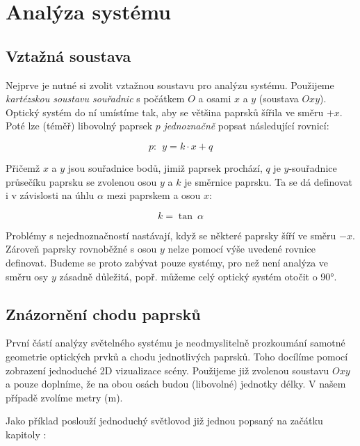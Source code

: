 \section{Analýza systému}
\label{sec:analyzasystemu}

\subsection{Vztažná soustava}

Nejprve je nutné si zvolit vztažnou soustavu pro analýzu systému. Použijeme \emph{kartézskou soustavu souřadnic} s počátkem $O$ a osami $x$ a $y$ (soustava $Oxy$). Optický systém do ní umístíme tak, aby se většina paprsků šířila ve směru $+x$. Poté lze (téměř) libovolný paprsek $p$ \emph{jednoznačně} popsat následující rovnicí:

\[ p:\ \ y = k \cdot x + q \]

Přičemž $x$ a $y$ jsou souřadnice bodů, jimiž paprsek prochází, $q$ je $y$-souřadnice průsečíku paprsku se zvolenou osou $y$ a $k$ je směrnice paprsku. Ta se dá definovat i v závislosti na úhlu $\alpha$ mezi paprskem a osou $x$:

\[ k = \tan\ \alpha \]

Problémy s nejednoznačností nastávají, když se některé paprsky šíří ve směru $-x$. Zároveň paprsky rovnoběžné s osou $y$ nelze pomocí výše uvedené rovnice definovat. Budeme se proto zabývat pouze systémy, pro než není analýza ve směru osy $y$ zásadně důležitá, popř. můžeme celý optický systém otočit o 90°.


\subsection{Znázornění chodu paprsků}
První částí analýzy světelného systému je neodmyslitelně prozkoumání samotné geometrie optických prvků a chodu jednotlivých paprsků. Toho docílíme pomocí zobrazení jednoduché 2D vizualizace scény. Použijeme již zvolenou soustavu $Oxy$ a pouze doplníme, že na obou osách budou (libovolné) jednotky délky. V našem případě zvolíme metry ($\mathrm{m}$).

Jako příklad poslouží jednoduchý světlovod již jednou popsaný na začátku kapitoly :



